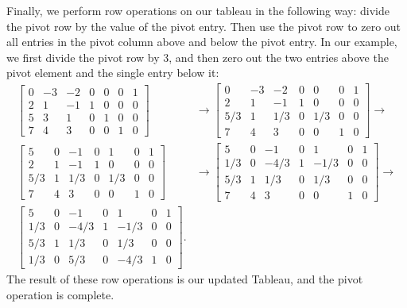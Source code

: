 Finally, we perform row operations on our tableau in the following way: divide the pivot row by the value of the pivot entry.
Then use the pivot row to zero out all entries in the pivot column above and below the pivot entry. In our example, we first divide
the pivot row by 3, and then zero out the two entries above the pivot element and the single entry below it:
\begin{align*}
\begin{bmatrix}
    0 & -3 & -2 & 0 & 0 & 0 & 1\\
    2 & 1 & -1 & 1 & 0 & 0 & 0\\
    5 & 3 & 1 & 0 & 1 & 0 & 0\\
    7 & 4 & 3 & 0 & 0 & 1 & 0
    \end{bmatrix} &\rightarrow
\begin{bmatrix}
    0 & -3 & -2 & 0 & 0 & 0 & 1\\
    2 & 1 & -1 & 1 & 0 & 0 & 0\\
    5/3 & 1 & 1/3 & 0 & 1/3 & 0 & 0\\
    7 & 4 & 3 & 0 & 0 & 1 & 0
    \end{bmatrix}\rightarrow\\
\begin{bmatrix}
    5 & 0 & -1 & 0 & 1 & 0 & 1\\
    2 & 1 & -1 & 1 & 0 & 0 & 0\\
    5/3 & 1 & 1/3 & 0 & 1/3 & 0 & 0\\
    7 & 4 & 3 & 0 & 0 & 1 & 0
    \end{bmatrix} &\rightarrow
\begin{bmatrix}
    5 & 0 & -1 & 0 & 1 & 0 & 1\\
    1/3 & 0 & -4/3 & 1 & -1/3 & 0 & 0\\
    5/3 & 1 & 1/3 & 0 & 1/3 & 0 & 0\\
    7 & 4 & 3 & 0 & 0 & 1 & 0
    \end{bmatrix}\rightarrow\\
\begin{bmatrix}
    5 & 0 & -1 & 0 & 1 & 0 & 1\\
    1/3 & 0 & -4/3 & 1 & -1/3 & 0 & 0\\
    5/3 & 1 & 1/3 & 0 & 1/3 & 0 & 0\\
    1/3 & 0 & 5/3 & 0 & -4/3 & 1 & 0
    \end{bmatrix}.   
\end{align*}
The result of these row operations is our updated Tableau, and the pivot operation is complete.

